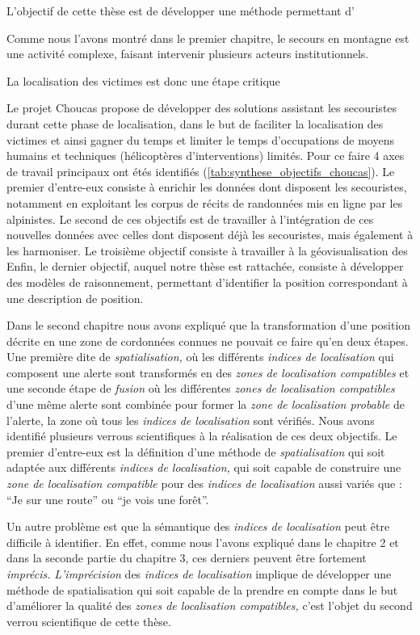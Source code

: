 L'objectif de cette thèse est de développer une méthode permettant d'

Comme nous l'avons montré dans le premier chapitre, le secours en
montagne est une activité complexe, faisant intervenir plusieurs
acteurs institutionnels.

La localisation des victimes est donc une étape critique

Le projet Choucas propose de développer des solutions assistant les
secouristes durant cette phase de localisation, dans le but de
faciliter la localisation des victimes et ainsi gagner du temps et
limiter le temps d'occupations de moyens humains et techniques
(hélicoptères d'interventions) limités. Pour ce faire 4 axes de
travail principaux ont étés identifiés
(\autoref{tab:synthese_objectifs_choucas}). Le premier d'entre-eux
consiste à enrichir les données dont disposent les secouristes,
notamment en exploitant les corpus de récits de randonnées mis en
ligne par les alpinistes. Le second de ces objectifs est de travailler
à l'intégration de ces nouvelles données avec celles dont disposent
déjà les secouristes, mais également à les harmoniser. Le troisième
objectif consiste à travailler à la géovisualisation des Enfin, le
dernier objectif, auquel notre thèse est rattachée, consiste à
développer des modèles de raisonnement, permettant d'identifier la
position correspondant à une description de position.

Dans le second chapitre nous avons expliqué que la transformation
d'une position décrite en une zone de cordonnées connues ne pouvait ce
faire qu'en deux étapes. Une première dite de \emph{spatialisation,}
où les différents \emph{indices de localisation} qui composent une
alerte sont transformés en des \emph{zones de localisation
  compatibles} et une seconde étape de \emph{fusion} où les
différentes \emph{zones de localisation compatibles} d'une même alerte
sont combinée pour former la \emph{zone de localisation probable} de
l'alerte, \ie la zone où tous les \emph{indices de localisation} sont
vérifiés. Nous avons identifié plusieurs verrous scientifiques à la
réalisation de ces deux objectifs.
%
Le premier d'entre-eux est la définition d'une méthode de
\emph{spatialisation} qui soit adaptée aux différents \emph{indices de
  localisation,} \ie qui soit capable de construire une \emph{zone de
  localisation compatible} pour des \emph{indices de localisation}
aussi variés que : \enquote{Je sur une route} ou \enquote{je vois une
  forêt}.

Un autre problème est que la sémantique des \emph{indices de
  localisation} peut être difficile à identifier. En effet, comme nous
l'avons expliqué dans le chapitre 2 et dans la seconde partie du
chapitre 3, ces derniers peuvent être fortement \emph{imprécis.}
\emph{L'imprécision} des \emph{indices de localisation} implique de
développer une méthode de spatialisation qui soit capable de la
prendre en compte dans le but d'améliorer la qualité des \emph{zones
  de localisation compatibles,} c'est l'objet du second verrou
scientifique de cette thèse.


